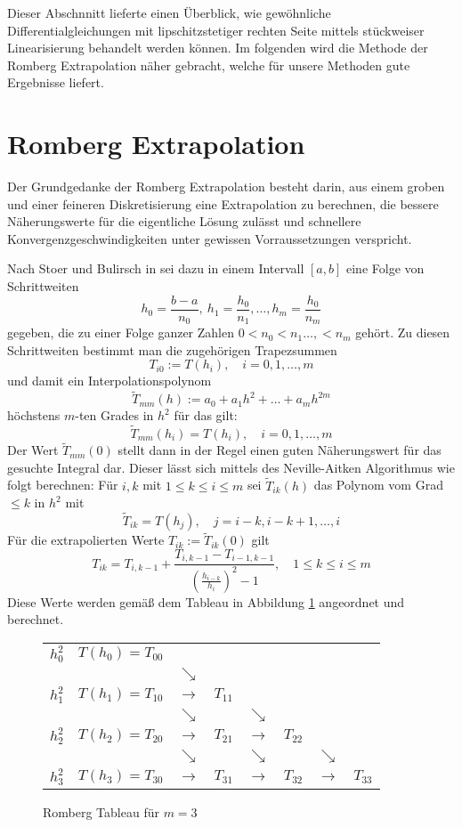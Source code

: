 Dieser Abschnnitt lieferte einen Überblick, wie gewöhnliche Differentialgleichungen mit lipschitzstetiger rechten Seite mittels stückweiser Linearisierung behandelt werden können. Im folgenden wird die Methode der Romberg Extrapolation näher gebracht, welche für unsere Methoden gute Ergebnisse liefert.
\section{Romberg Extrapolation}
Der Grundgedanke der Romberg Extrapolation besteht darin, aus einem groben und einer feineren Diskretisierung eine Extrapolation zu berechnen, die bessere Näherungswerte für die eigentliche Lösung zulässt und schnellere Konvergenzgeschwindigkeiten unter gewissen Vorraussetzungen verspricht.

Nach Stoer und Bulirsch in \cite{stoer1989numerische} sei dazu in einem Intervall $[a,b]$ eine Folge von Schrittweiten 
\[
 h_0 = \frac{b-a}{n_0},~ h_1 = \frac{h_0}{n_1},\ldots, h_m = \frac{h_0}{n_m}
\]
gegeben, die zu einer Folge ganzer Zahlen $0<n_0<n_1\ldots,<n_m$ gehört. Zu diesen Schrittweiten bestimmt man die zugehörigen Trapezsummen
\[
 T_{i0} := T(h_i), \quad i=0,1,\ldots,m
\]
und damit ein Interpolationspolynom 
\[
 \tilde T_{mm}(h):= a_0 + a_1h^2 +\ldots + a_m h^{2m}
\]
höchstens $m$-ten Grades in $h^2$ für das gilt:
\[
 \tilde T_{mm}(h_i) = T(h_i), \quad i=0,1,\ldots,m
\]
Der Wert $\tilde T_{mm}(0)$ stellt dann in der Regel einen guten Näherungswert für das gesuchte Integral dar. Dieser lässt sich mittels des Neville-Aitken Algorithmus \cite[(2.1.2)]{stoer1989numerische} wie folgt berechnen:
Für $i,k$ mit $1\leq k\leq i\leq m$ sei $\tilde T_{ik}(h)$ das Polynom vom Grad $\leq k$ in $h^2$ mit 
\[
 \tilde T_{ik} = T(h_j),\quad j=i-k,i-k+1,\ldots,i
\]
Für die extrapolierten Werte $T_{ik}:=\tilde T_{ik}(0)$ gilt
\begin{equation}
\label{eq:rombergFormular}
  T_{ik} = T_{i,k-1}+\frac{T_{i,k-1}-T_{i-1,k-1}}{\left(\frac{h_{i-k}}{h_i}\right)^2-1}, \quad 1\leq k\leq i\leq m
\end{equation}
Diese Werte werden gemäß dem Tableau in Abbildung \ref{fig:rombergTableau} angeordnet und berechnet.
\begin{figure}[H]
\centering
\begin{tabular}{ l | c c c c c c c }
  $h_0^2$ & $T(h_0)=T_{00}$\\
	  &		    &$\searrow$\\
  $h_1^2$ & $T(h_1)=T_{10}$ &$\rightarrow$	& $T_{11}$  \\
	  &		    &$\searrow$ & &$\searrow$ \\
  $h_2^2$ & $T(h_2)=T_{20}$ &$\rightarrow$	&$T_{21}$&$\rightarrow$&$T_{22}$\\
	  &		    &$\searrow$ & &$\searrow$& &$\searrow$ \\
  $h_3^2$ & $T(h_3)=T_{30}$ &$\rightarrow$	& $T_{31}$&  	 $\rightarrow$& $T_{32}$  &$\rightarrow$& $T_{33}$\\
\end{tabular}
\caption{Romberg Tableau für $m=3$}
\label{fig:rombergTableau}
\end{figure}

